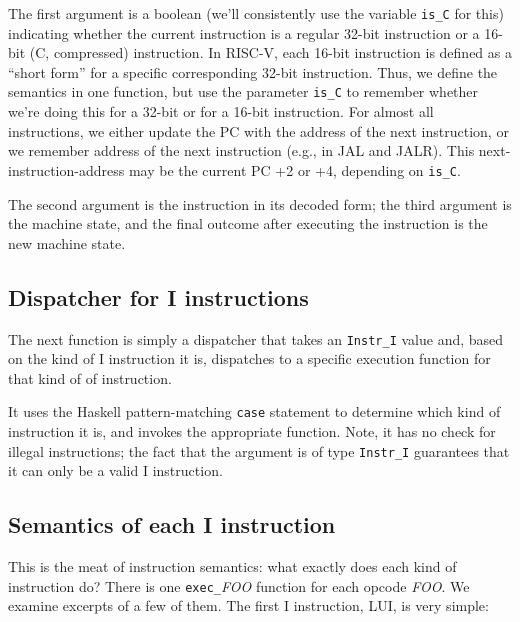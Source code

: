 \documentclass[11pt]{article}
\begin{document}
The first argument is a boolean (we'll consistently use the variable
\verb|is_C| for this) indicating whether the current instruction is a
regular 32-bit instruction or a 16-bit (C, compressed) instruction.
In RISC-V, each 16-bit instruction is defined as a ``short form'' for
a specific corresponding 32-bit instruction.  Thus, we define the
semantics in one function, but use the parameter \verb|is_C| to
remember whether we're doing this for a 32-bit or for a 16-bit
instruction.  For almost all instructions, we either update the PC
with the address of the next instruction, or we remember address of
the next instruction (e.g., in JAL and JALR). This
next-instruction-address may be the current PC +2 or +4, depending on
\verb|is_C|.

The second argument is the instruction in its decoded form; the third
argument is the machine state, and the final outcome after executing
the instruction is the new machine state.


\subsection{Dispatcher for I instructions}

The next function is simply a dispatcher that takes an \verb|Instr_I|
value and, based on the kind of I instruction it is, dispatches to a
specific execution function for that kind of of instruction.



It uses the Haskell pattern-matching \verb|case| statement to
determine which kind of instruction it is, and invokes the appropriate
function.  Note, it has no check for illegal instructions; the fact
that the argument is of type \verb|Instr_I| guarantees that it can
only be a valid I instruction.


\subsection{Semantics of each I instruction}

This is the meat of instruction semantics: what exactly does each kind
of instruction do?  There is one \verb|exec_|\emph{FOO} function for
each opcode \emph{FOO}.  We examine excerpts of a few of them.  The
first I instruction, LUI, is very simple:


\end{document}
